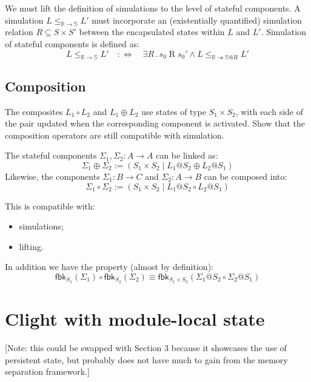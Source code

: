 \documentclass[acmsmall,screen,review,anonymous]{acmart}
\newcommand{\kw}[1]{\ensuremath{ \mathsf{#1} }}
\begin{document}
We must lift the definition of simulations
to the level of stateful components.
A simulation $L \le_{\mathbb{R} \rightarrow \mathbb{S}} L'$
must incorporate an (existentially quantified)
simulation relation $R \subseteq S \times S'$
between the encapsulated states within $L$ and $L'$.
Simulation of stateful components is defined as:
\[
  L \le_{\mathbb{R} \rightarrow \mathbb{S}} L' \quad :\Leftrightarrow \quad
  \exists R \mathbin{.}
    s_0 \mathrel{R} s_0' \wedge
    L \le_{\mathbb{R} \twoheadrightarrow \mathbb{S}@R} L'
\]

\subsection{Composition}

The composites $L_1 \circ L_2$ and $L_1 \oplus L_2$
use states of type $S_1 \times S_2$,
with each side of the pair updated when the corresponding component
is activated.
Show that the composition operators are
still compatible with simulation.

\begin{definition}[Linking]
The stateful components $\Sigma_1, \Sigma_2 : A \rightarrow A$
can be linked as:
\[
  \Sigma_1 \oplus \Sigma_2 :=
    ( S_1 \times S_2 \mid L_1@S_2 \oplus L_2@S_1 )
\]
Likewise, the components
$\Sigma_1 : B \rightarrow C$ and
$\Sigma_2 : A \rightarrow B$
can be composed into:
\[
  \Sigma_1 \circ \Sigma_2 :=
    ( S_1 \times S_2 \mid L_1@S_2 \circ L_2@S_1 )
\]
\end{definition}

\begin{lemma}
  This is compatible with:
  \begin{itemize}
    \item simulations;
    \item lifting.
  \end{itemize}
  In addition we have the property (almost by definition):
  \[
    \kw{fbk}_{S_1}(\Sigma_1) \circ \kw{fbk}_{S_2}(\Sigma_2) \equiv
    \kw{fbk}_{S_1 \times S_2}(\Sigma_1@S_2 \circ \Sigma_2@S_1)
  \]
\end{lemma}

\section{Clight with module-local state}

[Note: this could be swapped with Section 3
because it showcases the use of persistent state,
but probably does not have much to gain
from the memory separation framework.]
\end{document}
